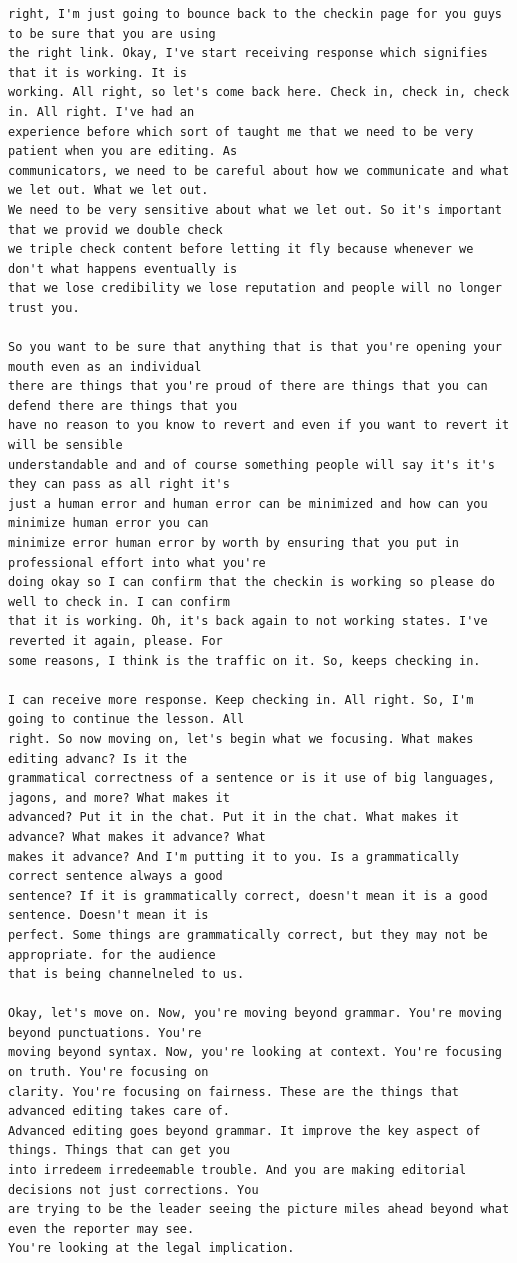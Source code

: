 {\begin{Verbatim}
right, I'm just going to bounce back to the checkin page for you guys to be sure that you are using
the right link. Okay, I've start receiving response which signifies that it is working. It is
working. All right, so let's come back here. Check in, check in, check in. All right. I've had an
experience before which sort of taught me that we need to be very patient when you are editing. As
communicators, we need to be careful about how we communicate and what we let out. What we let out.
We need to be very sensitive about what we let out. So it's important that we provid we double check
we triple check content before letting it fly because whenever we don't what happens eventually is
that we lose credibility we lose reputation and people will no longer trust you.

So you want to be sure that anything that is that you're opening your mouth even as an individual
there are things that you're proud of there are things that you can defend there are things that you
have no reason to you know to revert and even if you want to revert it will be sensible
understandable and and of course something people will say it's it's they can pass as all right it's
just a human error and human error can be minimized and how can you minimize human error you can
minimize error human error by worth by ensuring that you put in professional effort into what you're
doing okay so I can confirm that the checkin is working so please do well to check in. I can confirm
that it is working. Oh, it's back again to not working states. I've reverted it again, please. For
some reasons, I think is the traffic on it. So, keeps checking in.

I can receive more response. Keep checking in. All right. So, I'm going to continue the lesson. All
right. So now moving on, let's begin what we focusing. What makes editing advanc? Is it the
grammatical correctness of a sentence or is it use of big languages, jagons, and more? What makes it
advanced? Put it in the chat. Put it in the chat. What makes it advance? What makes it advance? What
makes it advance? And I'm putting it to you. Is a grammatically correct sentence always a good
sentence? If it is grammatically correct, doesn't mean it is a good sentence. Doesn't mean it is
perfect. Some things are grammatically correct, but they may not be appropriate. for the audience
that is being channelneled to us.

Okay, let's move on. Now, you're moving beyond grammar. You're moving beyond punctuations. You're
moving beyond syntax. Now, you're looking at context. You're focusing on truth. You're focusing on
clarity. You're focusing on fairness. These are the things that advanced editing takes care of.
Advanced editing goes beyond grammar. It improve the key aspect of things. Things that can get you
into irredeem irredeemable trouble. And you are making editorial decisions not just corrections. You
are trying to be the leader seeing the picture miles ahead beyond what even the reporter may see.
You're looking at the legal implication.


\end{Verbatim}}
